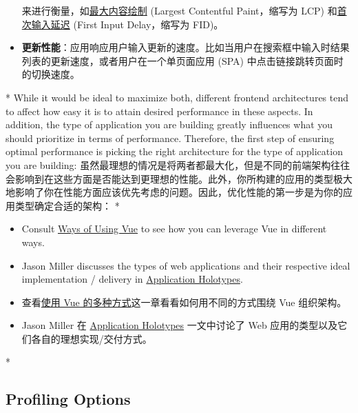 \begin{paracol}{2}
\begin{itemize}
  来进行衡量，如\href{https://web.dev/lcp/}{最大内容绘制} (Largest
  Contentful Paint，缩写为 LCP)
  和\href{https://web.dev/fid/}{首次输入延迟} (First Input Delay，缩写为
  FID)。
\item
  \textbf{更新性能}：应用响应用户输入更新的速度。比如当用户在搜索框中输入时结果列表的更新速度，或者用户在一个单页面应用
  (SPA) 中点击链接跳转页面时的切换速度。
\end{itemize}
\switchcolumn[0]*%
While it would be ideal to maximize both, different frontend
architectures tend to affect how easy it is to attain desired
performance in these aspects. In addition, the type of application you
are building greatly influences what you should prioritize in terms of
performance. Therefore, the first step of ensuring optimal performance
is picking the right architecture for the type of application you are
building:
\switchcolumn
虽然最理想的情况是将两者都最大化，但是不同的前端架构往往会影响到在这些方面是否能达到更理想的性能。此外，你所构建的应用的类型极大地影响了你在性能方面应该优先考虑的问题。因此，优化性能的第一步是为你的应用类型确定合适的架构： 
\switchcolumn[0]*%
\begin{itemize}
\item
  Consult
  \href{https://vuejs.org/guide/extras/ways-of-using-vue.html}{Ways of
  Using Vue} to see how you can leverage Vue in different ways.
\item
  Jason Miller discusses the types of web applications and their
  respective ideal implementation / delivery in
  \href{https://jasonformat.com/application-holotypes/}{Application
  Holotypes}.
\end{itemize}
\switchcolumn
\begin{itemize}
\item
  查看\href{https://cn.vuejs.org/guide/extras/ways-of-using-vue.html}{使用
  Vue 的多种方式}这一章看看如何用不同的方式围绕 Vue 组织架构。
\item
  Jason Miller 在
  \href{https://jasonformat.com/application-holotypes/}{Application
  Holotypes} 一文中讨论了 Web
  应用的类型以及它们各自的理想实现/交付方式。
\end{itemize}
\switchcolumn[0]*%
\subsection{Profiling Options}
\switchcolumn

\end{paracol}
